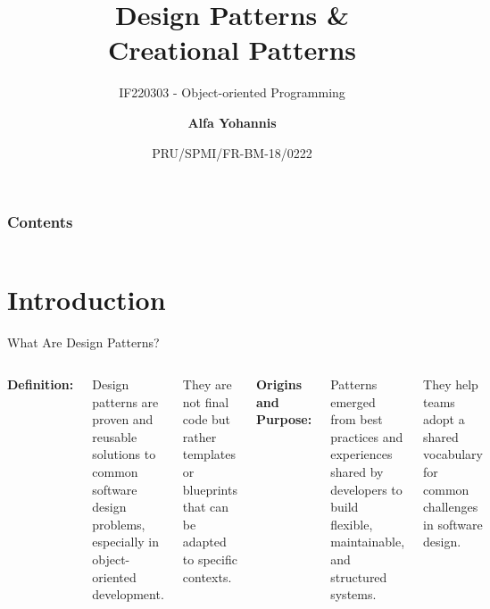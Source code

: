 \documentclass[aspectratio=169, table]{beamer}
\subtitle{IF220303 - Object-oriented Programming}
\title{\Huge{Design Patterns \&\\\vspace{5pt}Creational Patterns}}
\date[Serial]{\scriptsize {PRU/SPMI/FR-BM-18/0222}}
\author[Pradita]{\small {\textbf{Alfa Yohannis}}}
\begin{document}
\frame{\titlepage}

\begin{frame}[fragile]
\frametitle{Contents}
\vspace{20pt}
\begin{columns}[t]
\tableofcontents[sections={1-5}]

\tableofcontents[sections={6-10}]
\end{columns}
\end{frame}

\section{Introduction}

\begin{frame}[fragile]{What Are Design Patterns?}
\vspace{10pt}
\begin{columns}[T]
\textbf{Definition:}

Design patterns are proven and reusable solutions to common software design problems, especially in object-oriented development.

\vspace{8pt}
They are not final code but rather templates or blueprints that can be adapted to specific contexts.

\textbf{Origins and Purpose:}

Patterns emerged from best practices and experiences shared by developers to build flexible, maintainable, and structured systems.

\vspace{8pt}
They help teams adopt a shared vocabulary for common challenges in software design.
\end{columns}
\end{frame}
\end{document}

